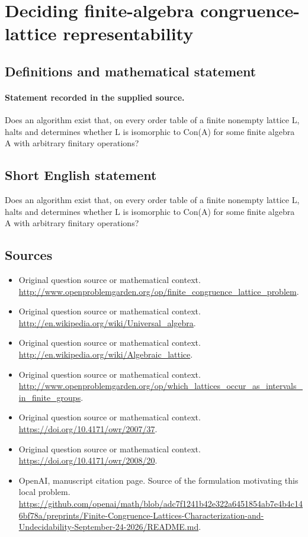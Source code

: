 \documentclass[11pt]{article}
\begin{document}
\section*{Deciding finite-algebra congruence-lattice representability}\label{statement}
\subsection{Definitions and mathematical statement}
\paragraph{Statement recorded in the supplied source.}
Does an algorithm exist that, on every order table of a finite nonempty lattice L, halts and determines whether L is isomorphic to Con(A) for some finite algebra A with arbitrary finitary operations?
\subsection{Short English statement}
Does an algorithm exist that, on every order table of a finite nonempty lattice L, halts and determines whether L is isomorphic to Con(A) for some finite algebra A with arbitrary finitary operations?
\subsection{Sources}
\begin{itemize}
\item[S1] Original question source or mathematical context.
\url{http://www.openproblemgarden.org/op/finite_congruence_lattice_problem}.
\item[S2] Original question source or mathematical context.
\url{http://en.wikipedia.org/wiki/Universal_algebra}.
\item[S3] Original question source or mathematical context.
\url{http://en.wikipedia.org/wiki/Algebraic_lattice}.
\item[S4] Original question source or mathematical context.
\url{http://www.openproblemgarden.org/op/which_lattices_occur_as_intervals_in_finite_groups}.
\item[S5] Original question source or mathematical context.
\url{https://doi.org/10.4171/owr/2007/37}.
\item[S6] Original question source or mathematical context.
\url{https://doi.org/10.4171/owr/2008/20}.
\item[S7] OpenAI, manuscript citation page. Source of the formulation motivating this local problem.
\url{https://github.com/openai/math/blob/adc7f1241b42e322a6451854ab7e4b4c146bf78a/preprints/Finite-Congruence-Lattices-Characterization-and-Undecidability-September-24-2026/README.md}.
\end{itemize}
\end{document}
